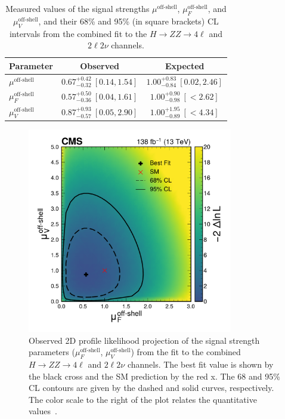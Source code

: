 \begin{table}[!htb]
\centering
\begin{tabular}{lcc}
  Parameter                & {Observed}          &  {Expected}   \\
  \hline
  $\mu^\text{off-shell}$ &  $0.67^{+ 0.42}_{-0.32 }\ [0.14,1.54]$ & $1.00^{+ 0.83}_{-0.84}\ [0.02,2.46]$ \\
  $\mu_F^\text{off-shell}$ &  $0.57^{+ 0.50}_{- 0.36}\ [0.04,1.61]$ & $1.00^{+0.90}_{-0.98}\ [{<}2.62]$\\
  $\mu_V^\text{off-shell}$ &  $ 0.87^{+0.93}_{-0.57}\ [0.05,2.90]$ & $1.00^{+1.95}_{-0.89}\ [{<}4.34]$ \\
\end{tabular}
\caption{
  Measured values of the signal strengths $\mu^\text{off-shell}$, $\mu_F^\text{off-shell}$, and $\mu_V^\text{off-shell}$,
  and their 68\% and 95\% (in square brackets) CL intervals from the combined fit to the \offshell $H\to ZZ\to4\ell$ and $2\ell2\nu$ channels.
}
\label{table:muoffshell}
\end{table}

\begin{figure}[!htb]
  \centering
  \includegraphics[width=0.8\textwidth]{figures/Figure_012.pdf}  
  \caption
      {
        Observed 2D profile likelihood projection of the \offshell signal strength parameters ($\mu^\text{off-shell}_{F}$, $\mu^\text{off-shell}_{V}$) 
        from the fit to the combined \offshell $H\to ZZ\to4\ell$ and $2\ell2\nu$ channels. The best fit value is shown by the black cross and the SM 
        prediction by the red x. The 68 and 95\% CL contours are given by the dashed and solid curves, respectively. The color scale to the right of the plot relates the quantitative values~\cite{PhysRevD.111.092014}.
      }
    \label{fig:muoffshell} 
\end{figure}


